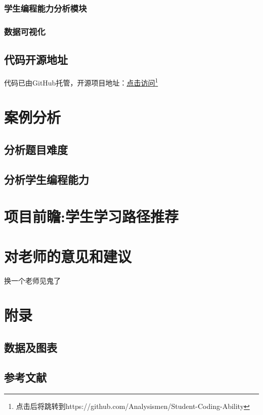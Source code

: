 \documentclass[UTF8]{ctexart}
\begin{document}
\subsubsection{学生编程能力分析模块}
\subsubsection{数据可视化}
\subsection{代码开源地址}
代码已由GitHub托管，开源项目地址：\href{https://github.com/Analysismen/Student-Coding-Ability}{点击访问}\footnote{点击后将跳转到https://github.com/Analysismen/Student-Coding-Ability}
\section{案例分析}
\subsection{分析题目难度}
\subsection{分析学生编程能力}
\section{项目前瞻:学生学习路径推荐}
\section{对老师的意见和建议}
换一个老师见鬼了
\section{附录}
\subsection{数据及图表}
\subsection{参考文献}
\end{document}
